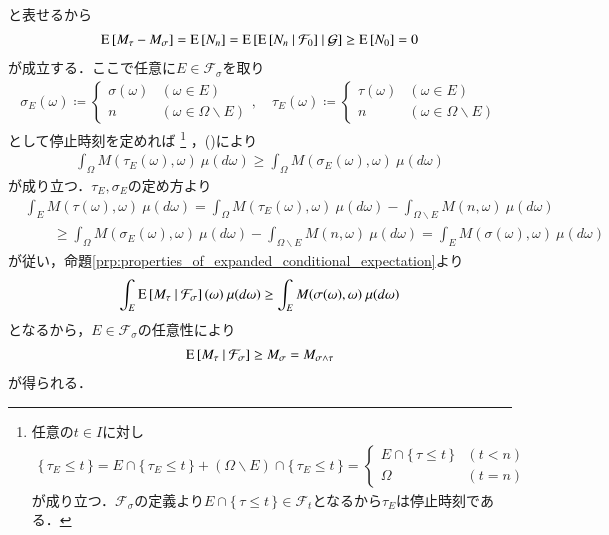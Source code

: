 \begin{prf}
\begin{description}
\begin{align}
				\end{align}
				と表せるから
				\begin{align}
					\operatorname{E} \left[ M_\tau - M_\sigma \right] = \operatorname{E} \left[ N_n \right] = \operatorname{E} \left[ \operatorname{E} \left[ N_n \ \middle|\ \mathcal{F}_0 \right] \ \middle|\ \mathcal{G} \right] \geq \operatorname{E} \left[ N_0 \right] = 0
					\label{eq:thm_optional_sampling_theorem_1_1}
				\end{align}
				が成立する．ここで任意に$E \in \mathcal{F}_\sigma$を取り
				\begin{align}
					\sigma_E(\omega) \coloneqq
					\begin{cases}
						\sigma(\omega) & (\omega \in E) \\
						n & (\omega \in \Omega \backslash E) 
					\end{cases}
					,\quad \tau_E(\omega) \coloneqq
					\begin{cases}
						\tau(\omega) & (\omega \in E) \\
						n & (\omega \in \Omega \backslash E) 
					\end{cases}
				\end{align}
				として停止時刻を定めれば
				\footnote{
					任意の$t \in I$に対し
					\begin{align}
						\{\, \tau_E \leq t\, \} 
						= E \cap \{\, \tau_E \leq t\, \} + (\Omega \backslash E) \cap \{\, \tau_E \leq t\, \} 
						=\begin{cases}
							E \cap \{\, \tau \leq t\, \} & (t < n) \\
							\Omega & (t = n)
						\end{cases}
					\end{align}
					が成り立つ．$\mathcal{F}_\sigma$の定義より$E \cap \{\, \tau \leq t\, \} \in \mathcal{F}_t$となるから$\tau_E$は停止時刻である．
				}
				，()により
				\begin{align}
					\int_\Omega M(\tau_E(\omega),\omega)\ \mu(d\omega) \geq \int_\Omega M(\sigma_E(\omega),\omega)\ \mu(d\omega)
				\end{align}
				が成り立つ．$\tau_E,\sigma_E$の定め方より
				\begin{align}
					&\int_E M(\tau(\omega),\omega)\ \mu(d\omega) 
					= \int_\Omega M(\tau_E(\omega),\omega)\ \mu(d\omega) - \int_{\Omega \backslash E} M(n,\omega)\ \mu(d\omega) \\
					&\qquad \geq \int_\Omega M(\sigma_E(\omega),\omega)\ \mu(d\omega) - \int_{\Omega \backslash E} M(n,\omega)\ \mu(d\omega)
					= \int_E M(\sigma(\omega),\omega)\ \mu(d\omega)
				\end{align}
				が従い，命題\ref{prp:properties_of_expanded_conditional_expectation}より
				\begin{align}
					\int_E \cexp{M_\tau}{\mathcal{F}_\sigma}(\omega)\ \mu(d\omega) \geq \int_E M(\sigma(\omega),\omega)\ \mu(d\omega)
				\end{align}
				となるから，$E \in \mathcal{F}_\sigma$の任意性により
				\begin{align}
					\operatorname{E} \left[ M_\tau \ \middle|\ \mathcal{F}_\sigma \right] \geq M_\sigma = M_{\sigma \wedge \tau}
				\end{align}
				が得られる．
			

\end{description}
\end{prf}
